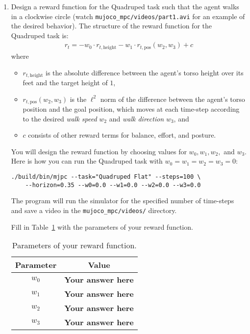 \documentclass[12pt]{article}
\begin{document}
\begin{enumerate}
\item Design a reward function for the Quadruped task such that the agent walks in a clockwise circle (watch \texttt{mujoco\_mpc/videos/part1.avi} for an example of the desired behavior). The structure of the reward function for the Quadruped task is:
\begin{align*}
    r_t = -w_0 \cdot r_{t, \text{height}} - w_1 \cdot r_{t, \text{pos}}(w_2, w_3) + c
\end{align*}
where
\begin{itemize}
    \item $r_{t, \text{height}}$ is the absolute difference between the agent's torso height over its feet and the target height of $1$,
    \item $r_{t, \text{pos}}(w_2, w_3)$ is the $\ell^2$ norm of the difference between the agent's torso position and the goal position, which moves at each time-step according to the desired \emph{walk speed} $w_2$ and \emph{walk direction} $w_3$, and
    \item $c$ consists of other reward terms for balance, effort, and posture.
\end{itemize}

You will design the reward function by choosing values for $w_0, w_1, w_2,$ and $w_3$. Here is how you can run the Quadruped task with $w_0 = w_1 = w_2 = w_3 = 0$:
\begin{tcolorbox}[width=\linewidth, sharp corners=all, colback=white!95!black]
\begin{verbatim}
./build/bin/mjpc --task="Quadruped Flat" --steps=100 \
    --horizon=0.35 --w0=0.0 --w1=0.0 --w2=0.0 --w3=0.0
\end{verbatim}
\end{tcolorbox}

\vspace{0.2cm}

The program will run the simulator for the specified number of time-steps and save a video in the \texttt{mujoco\_mpc/videos/} directory.

Fill in Table~\ref{table:Problem_1} with the parameters of your reward function.
\begin{table}[h]
\centering
\begin{tabular}{cc}
    \toprule
    Parameter & Value \\
    \midrule
    $w_0$ & \textbf{\color{red}Your answer here} \\
    $w_1$ & \textbf{\color{red}Your answer here} \\
    $w_2$ & \textbf{\color{red}Your answer here} \\
    $w_3$ & \textbf{\color{red}Your answer here} \\
    \bottomrule
\end{tabular}
\label{table:Problem_1}
\caption{Parameters of your reward function.}
\end{table}


\end{enumerate}
\end{document}
